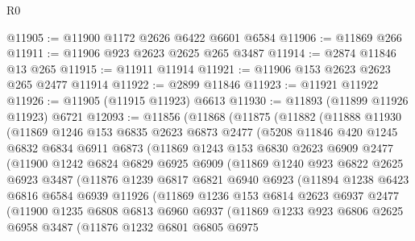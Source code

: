 \begin{lexlean}{R0}
\begin{coremodule}
@11905 := @11900 @1172 @2626 @6422 @6601 @6584
@11906 := @11869 @266
@11911 := @11906 @923 @2623 @2625 @265 @3487
@11914 := @2874 @11846 @13 @265
@11915 := @11911 @11914
@11921 := @11906 @153 @2623 @2623 @265 @2477 @11914
@11922 := @2899 @11846
@11923 := @11921 @11922
@11926 := @11905 (@11915 @11923) @6613
@11930 := @11893 (@11899 @11926 @11923) @6721
@12093 := @11856
    (@11868
      (@11875
        (@11882
          (@11888
            @11930
            (@11869
              @1246
              @153
              @6835
              @2623
              @6873
              @2477
              (@5208
                @11846
                @420
                @1245
                @6832
                @6834
                @6911
                @6873
                (@11869
                  @1243
                  @153
                  @6830
                  @2623
                  @6909
                  @2477
                  (@11900
                    @1242
                    @6824
                    @6829
                    @6925
                    @6909
                    (@11869
                      @1240
                      @923
                      @6822
                      @2625
                      @6923
                      @3487
                      (@11876
                        @1239
                        @6817
                        @6821
                        @6940
                        @6923
                        (@11894
                          @1238
                          @6423
                          @6816
                          @6584
                          @6939
                          @11926
                          (@11869
                            @1236
                            @153
                            @6814
                            @2623
                            @6937
                            @2477
                            (@11900
                              @1235
                              @6808
                              @6813
                              @6960
                              @6937
                              (@11869
                                @1233
                                @923
                                @6806
                                @2625
                                @6958
                                @3487
                                (@11876
                                  @1232
                                  @6801
                                  @6805
                                  @6975

\end{coremodule}
\end{lexlean}

